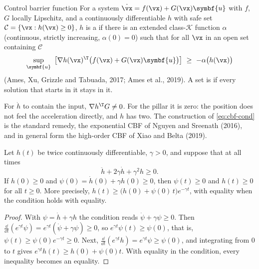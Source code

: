 \begin{definition}{Control barrier function}
For a system $\dot{\vx} = f(\vx) + G(\vx)\symbf{u}$ with $f$, $G$ locally Lipschitz, and a continuously differentiable $h$ with safe set $\mathcal C = \{\vx : h(\vx) \ge 0\}$, $h$ is a  if there is an extended class-$\mathcal K$ function $\alpha$ (continuous, strictly increasing, $\alpha(0) = 0$) such that for all $\vx$ in an open set containing $\mathcal C$
\begin{equation*}
  \sup_{\symbf{u}}\ \big[\nabla h(\vx)^\T\big(f(\vx) + G(\vx)\symbf{u}\big)\big] \ \ge\ -\alpha\big(h(\vx)\big)
\end{equation*}
(Ames, Xu, Grizzle and Tabuada, 2017; Ames et al., 2019). A set is  if every solution that starts in it stays in it.
\end{definition}

For $\dot h$ to contain the input, $\nabla h^\T G \ne 0$. For the pillar it is zero: the position does not feel the acceleration directly, and $h$ has  two. The construction of \cref{eq:cbf-cond} is the standard remedy, the exponential CBF of Nguyen and Sreenath (2016), and in general form the high-order CBF of Xiao and Belta (2019).

\begin{theorem}
\label{thm:cbf-invariance}
Let $h(t)$ be twice continuously differentiable, $\gamma > 0$, and suppose that at all times
\begin{equation*}
  \ddot h + 2\gamma\dot h + \gamma^2 h \ge 0 .
\end{equation*}
If $h(0) \ge 0$ and $\psi(0) = \dot h(0) + \gamma h(0) \ge 0$, then $\psi(t) \ge 0$ and $h(t) \ge 0$ for all $t \ge 0$. More precisely, $h(t) \ge \big(h(0) + \psi(0)\,t\big)e^{-\gamma t}$, with equality when the condition holds with equality.
\end{theorem}
\begin{proof}
With $\psi = \dot h + \gamma h$ the condition reads $\dot\psi + \gamma\psi \ge 0$. Then $\tfrac{\dd}{\dd t}(e^{\gamma t}\psi) = e^{\gamma t}(\dot\psi + \gamma\psi) \ge 0$, so $e^{\gamma t}\psi(t) \ge \psi(0)$, that is, $\psi(t) \ge \psi(0)e^{-\gamma t} \ge 0$. Next, $\tfrac{\dd}{\dd t}(e^{\gamma t}h) = e^{\gamma t}\psi \ge \psi(0)$, and integrating from 0 to $t$ gives $e^{\gamma t}h(t) \ge h(0) + \psi(0)t$. With equality in the condition, every inequality becomes an equality.
\end{proof}

